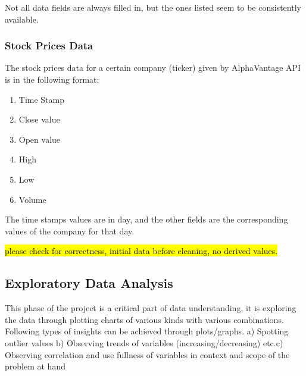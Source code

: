 \documentclass[sigconf, nonacm]{acmart}
\begin{document}
Not all data fields are always filled in, but the ones listed seem to be consistently available.

\subsubsection{Stock Prices Data}
The stock prices data for a certain company (ticker) given by AlphaVantage API is in the following format:

\begin{enumerate}
    \item Time Stamp
    \item Close value
    \item Open value
    \item High
    \item Low
    \item Volume
\end{enumerate}

The time stamps values are in day, and the other fields are the corresponding values of the company for that day.

\hl{please check for correctness, initial data before cleaning, no derived values.}

\subsection{Exploratory Data Analysis} %
This phase of the project is a critical part of data understanding, it is exploring the data through plotting charts of various kinds with various combinations. Following types of insights can be achieved through plots/graphs. a) Spotting outlier values b)
Observing trends of variables (increasing/decreasing) etc.c) Observing correlation and use fullness of variables  in context and scope of the problem at hand
\end{document}
